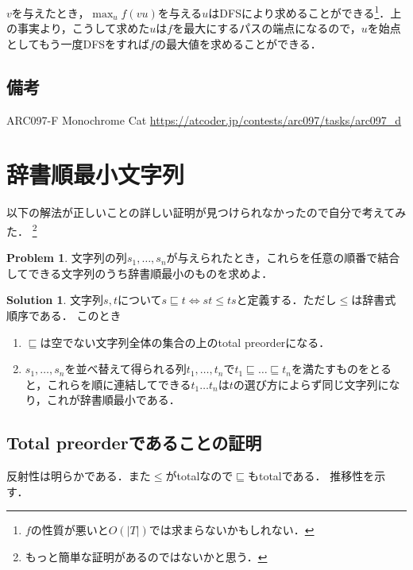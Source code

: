 \documentclass{scrartcl}
\theoremstyle{definition}
\newtheorem*{problem}{Problem}
\newtheorem*{solution}{Solution}
\begin{document}
$v$を与えたとき，$\max_u f(vu)$を与える$u$はDFSにより求めることができる\footnote{$f$の性質が悪いと$O(|T|)$では求まらないかもしれない．}．上の事実より，こうして求めた$u$は$f$を最大にするパスの端点になるので，$u$を始点としてもう一度DFSをすれば$f$の最大値を求めることができる．

\subsection*{備考}

ARC097-F Monochrome Cat \url{https://atcoder.jp/contests/arc097/tasks/arc097_d}

\section{辞書順最小文字列}

\newcommand{\cle}{\sqsubseteq}
\newcommand{\clt}{\sqsubset}
\newcommand{\ceq}{\approx}
\newcommand{\bag}[1]{\lbag#1\rbag}

以下の解法が正しいことの詳しい証明が見つけられなかったので自分で考えてみた．
\footnote{もっと簡単な証明があるのではないかと思う．}

\begin{screen}
  \begin{problem}
    文字列の列$s_1, \dots, s_n$が与えられたとき，これらを任意の順番で結合してできる文字列のうち辞書順最小のものを求めよ．
  \end{problem}
  \begin{solution}
    文字列$s, t$について$s \cle t \iff st \le ts$と定義する．ただし$\le$は辞書式順序である．
    このとき
    \begin{enumerate}
    \item $\cle$は空でない文字列全体の集合の上のtotal preorderになる．
    \item $s_1, \dots, s_n$を並べ替えて得られる列$t_1, \dots, t_n$で$t_1 \cle \dots \cle t_n$を満たすものをとると，これらを順に連結してできる$t_1\dots t_n$は$t$の選び方によらず同じ文字列になり，これが辞書順最小である．
    \end{enumerate}
  \end{solution}
\end{screen}

\subsection{Total preorderであることの証明}

反射性は明らかである．また$\le$がtotalなので$\cle$もtotalである．
推移性を示す．
\end{document}
